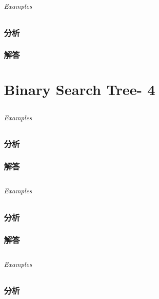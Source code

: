 \documentclass[UTF8,a4paper,12pt]{ctexbook}
\begin{document}
\section{}
	
	\subparagraph{Examples}
	
	\subsection{分析}
	
	\subsection{解答}
\chapter{Binary Search Tree- 4}
\section{}
	
	\subparagraph{Examples}
	
	\subsection{分析}
	
	\subsection{解答}
	
\section{}
	
	\subparagraph{Examples}
	
	\subsection{分析}
	
	\subsection{解答}
	
\section{}
	
	\subparagraph{Examples}
	
	\subsection{分析}
	
\end{document}
